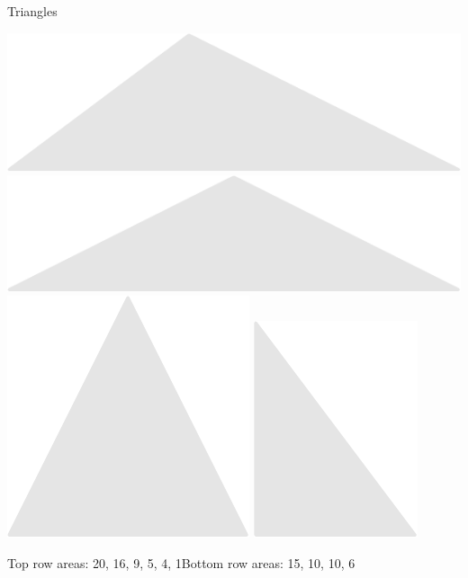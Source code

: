 \documentclass[14pt]{beamer}
\begin{document}
\begin{frame}{Triangles}
\begin{center}
            \includegraphics[scale=0.3]{figures/figure024g.pdf}\quad
            \includegraphics[scale=0.3]{figures/figure024h.pdf}\quad
            \includegraphics[scale=0.3]{figures/figure024i.pdf}\quad
            \includegraphics[scale=0.3]{figures/figure024j.pdf}\\

            \bigskip

            {\footnotesize Top row areas: 20, 16, 9, 5, 4, 1\qquad Bottom row areas: 15, 10, 10, 6}
        \end{center}
    \end{frame}
\end{document}
